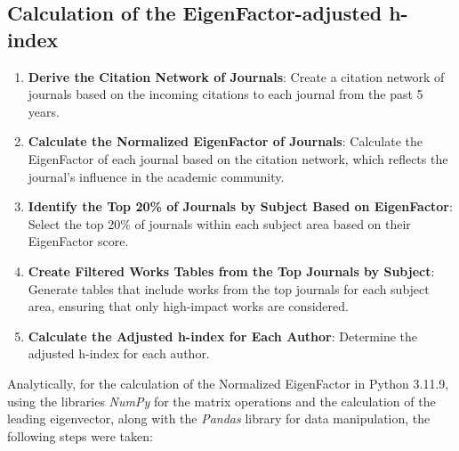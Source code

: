 \subsection{Calculation of the EigenFactor-adjusted h-index}
\begin{enumerate}
      \item \textbf{Derive the Citation Network of Journals}: Create a citation network of journals based on the
            incoming citations to each journal from the past 5 years.
      \item \textbf{Calculate the Normalized EigenFactor of Journals}: Calculate the EigenFactor of each journal based on the
            citation network, which reflects the journal's influence in the academic community.
      \item \textbf{Identify the Top 20\% of Journals by Subject Based on EigenFactor}: Select the top 20\% of journals within
            each subject area based on their EigenFactor score\@.

      \item \textbf{Create Filtered Works Tables from the Top Journals by Subject}: Generate tables that include works from
            the top journals for each subject area, ensuring that only high-impact works are considered.


      \item \textbf{Calculate the Adjusted h-index for Each Author}: Determine the adjusted h-index for each author.
\end{enumerate}

Analytically, for the calculation of the Normalized EigenFactor in Python
3.11.9, using the libraries \emph{NumPy} for the matrix operations and the
calculation of the leading eigenvector, along with the \emph{Pandas} library
for data manipulation, the following steps were taken:

